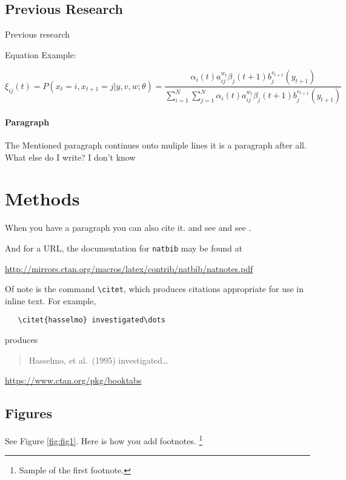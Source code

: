 \documentclass{article}
\begin{document}
\subsection{Previous Research}
Previous research \par
Equation Example: \newline

\begin{equation}
\xi _{ij}(t)=P(x_{t}=i,x_{t+1}=j|y,v,w;\theta)= {\frac {\alpha _{i}(t)a^{w_t}_{ij}\beta _{j}(t+1)b^{v_{t+1}}_{j}(y_{t+1})}{\sum _{i=1}^{N} \sum _{j=1}^{N} \alpha _{i}(t)a^{w_t}_{ij}\beta _{j}(t+1)b^{v_{t+1}}_{j}(y_{t+1})}}
\end{equation}


\paragraph{Paragraph}
The Mentioned paragraph continues onto muliple lines it is a paragraph after all. What else do I write? I don't know

\section{Methods}
\label{sec:others}
When you have a paragraph you can also cite it. \cite{Prasetia} and see \cite{Chen} and see \cite{Corral}.

And for a URL, the documentation for \verb+natbib+ may be found at
\begin{center}
  \url{http://mirrors.ctan.org/macros/latex/contrib/natbib/natnotes.pdf}
\end{center}
Of note is the command \verb+\citet+, which produces citations
appropriate for use in inline text.  For example, 
\begin{verbatim}
   \citet{hasselmo} investigated\dots
\end{verbatim}
produces
\begin{quote}
  Hasselmo, et al.\ (1995) investigated\dots
\end{quote}

\begin{center}
  \url{https://www.ctan.org/pkg/booktabs}
\end{center}


\subsection{Figures}
\lipsum[10] 
See Figure \ref{fig:fig1}. Here is how you add footnotes. \footnote{Sample of the first footnote.}
\lipsum[11] 
\end{document}

